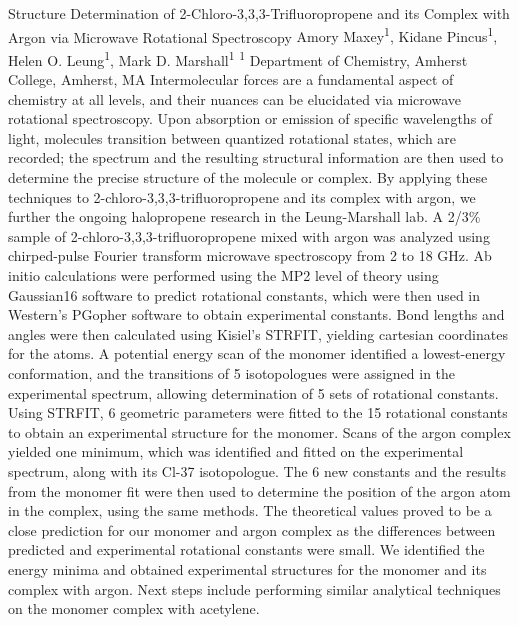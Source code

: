 \makeabstract
    {
    Structure Determination of 2-Chloro-3,3,3-Trifluoropropene and its Complex with Argon via Microwave Rotational Spectroscopy
    }
    {
    Amory Maxey\textsuperscript{1}, Kidane Pincus\textsuperscript{1}, Helen O. Leung\textsuperscript{1}, Mark D. Marshall\textsuperscript{1}
    }
    {
    \textsuperscript{1} Department of Chemistry, Amherst College, Amherst, MA
    }
    {
    Intermolecular forces are a fundamental aspect of chemistry at all levels, and their nuances can be elucidated via microwave rotational spectroscopy. Upon absorption or emission of specific wavelengths of light, molecules transition between quantized rotational states, which are recorded; the spectrum and the resulting structural information are then used to determine the precise structure of the molecule or complex. By applying these techniques to 2-chloro-3,3,3-trifluoropropene and its complex with argon, we further the ongoing halopropene research in the Leung-Marshall lab.
    }
    {
    A 2/3\% sample of 2-chloro-3,3,3-trifluoropropene mixed with argon was analyzed using chirped-pulse Fourier transform microwave spectroscopy from 2 to 18 GHz. Ab initio calculations were performed using the MP2 level of theory using Gaussian16 software to predict rotational constants, which were then used in Western{\textquoteright}s PGopher software to obtain experimental constants. Bond lengths and angles were then calculated using Kisiel{\textquoteright}s STRFIT, yielding cartesian coordinates for the atoms.
    }
    {
    A potential energy scan of the monomer identified a lowest-energy conformation, and the transitions of 5 isotopologues were assigned in the experimental spectrum, allowing determination of 5 sets of rotational constants. Using STRFIT, 6 geometric parameters were fitted to the 15 rotational constants to obtain an experimental structure for the monomer. Scans of the argon complex yielded one minimum, which was identified and fitted on the experimental spectrum, along with its Cl-37 isotopologue. The 6 new constants and the results from the monomer fit were then used to determine the position of the argon atom in the complex, using the same methods.
    }
    {
    The theoretical values proved to be a close prediction for our monomer and argon complex as the differences between predicted and experimental rotational constants were small. We identified the energy minima and obtained experimental structures for the monomer and its complex with argon. Next steps include performing similar analytical techniques on the monomer complex with acetylene.
    }

    \newpage
    